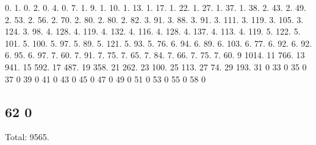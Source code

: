 0. 1. 0. 2. 0. 4. 0. 7. 1. 9. 1. 10. 1. 13. 1. 17. 1. 22. 1. 27. 1. 37. 1. 38. 2. 43. 2. 49. 2. 53. 2. 56. 2. 70. 2. 80. 2. 80. 2. 82. 3. 91. 3. 88. 3. 91. 3. 111. 3. 119. 3. 105. 3. 124. 3. 98. 4. 128. 4. 119. 4. 132. 4. 116. 4. 128. 4. 137. 4. 113. 4. 119. 5. 122. 5. 101. 5. 100. 5. 97. 5. 89. 5. 121. 5. 93. 5. 76. 6. 94. 6. 89. 6. 103. 6. 77. 6. 92. 6. 92. 6. 95. 6. 97. 7. 60. 7. 91. 7. 75. 7. 65. 7. 84. 7. 66. 7. 75. 7. 60. 9 1014. 11 766. 13 941. 15 592. 17 487. 19 358. 21 262. 23 100. 25 113. 27 74. 29 193. 31 0 33 0 35 0 37 0 39 0 41 0 43 0 45 0 47 0 49 0 51 0 53 0 55 0 58 0 \subsection*{62 0 }

Total\+: 9565. 